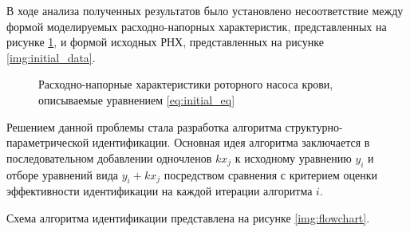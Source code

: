 В ходе анализа полученных результатов было установлено несоответствие между формой моделируемых расходно-напорных характеристик, представленных на рисунке \ref{img:pump_identification_first_stage}, и формой исходных РНХ, представленных на рисунке \ref{img:initial_data}. 

\begin{figure}[ht]
  \caption{Расходно-напорные характеристики роторного насоса крови, описываемые уравнением \eqref{eq:initial_eq}}
  \label{img:pump_identification_first_stage}  
\end{figure}

Решением данной проблемы стала разработка алгоритма структурно-параметрической идентификации. Основная идея алгоритма заключается в последовательном добавлении одночленов $kx_j$ к исходному уравнению $y_i$ и отборе уравнений вида $y_i + kx_j$ посредством сравнения с критерием оценки эффективности идентификации на каждой итерации алгоритма $i$. 

Схема алгоритма идентификации представлена на рисунке \ref{img:flowchart}.

